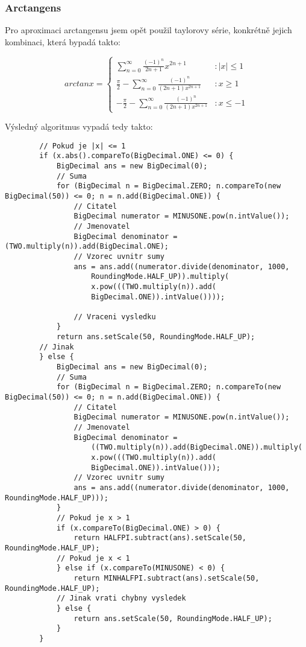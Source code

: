 \documentclass{article}
\begin{document}
    \subsubsection{Arctangens}
    Pro aproximaci arctangensu jsem opět použil taylorovy série, konkrétně jejich kombinaci, která bypadá takto:
    \begin{center}
        \begin{equation}            
            arctan x = \begin{cases}
                \displaystyle\sum_{n=0}^{\infty}\frac{(-1)^n}{2n+1}x^{2n+1} & \text{$: |x|\leq 1$}\\
                \frac{\pi}{2}-\displaystyle\sum_{n=0}^{\infty}\frac{(-1)^n}{(2n+1)x^{2n+1}} & \text{$: x \geq 1$}\\
                -\frac{\pi}{2}-\displaystyle\sum_{n=0}^{\infty}\frac{(-1)^n}{(2n+1)x^{2n+1}} & \text{$: x \leq -1$}
            \end{cases}
        \end{equation}
    \end{center}
    Výsledný algoritmus vypadá tedy takto:
    \sloppy
    \begin{lstlisting}
        // Pokud je |x| <= 1
        if (x.abs().compareTo(BigDecimal.ONE) <= 0) {
            BigDecimal ans = new BigDecimal(0);
            // Suma
            for (BigDecimal n = BigDecimal.ZERO; n.compareTo(new BigDecimal(50)) <= 0; n = n.add(BigDecimal.ONE)) {
                // Citatel
                BigDecimal numerator = MINUSONE.pow(n.intValue());
                // Jmenovatel
                BigDecimal denominator = (TWO.multiply(n)).add(BigDecimal.ONE);
                // Vzorec uvnitr sumy
                ans = ans.add((numerator.divide(denominator, 1000, 
                    RoundingMode.HALF_UP)).multiply(
                    x.pow(((TWO.multiply(n)).add(
                    BigDecimal.ONE)).intValue())));

                // Vraceni vysledku
            }
            return ans.setScale(50, RoundingMode.HALF_UP);
        // Jinak
        } else {
            BigDecimal ans = new BigDecimal(0);
            // Suma
            for (BigDecimal n = BigDecimal.ZERO; n.compareTo(new BigDecimal(50)) <= 0; n = n.add(BigDecimal.ONE)) {
                // Citatel
                BigDecimal numerator = MINUSONE.pow(n.intValue());
                // Jmenovatel
                BigDecimal denominator = 
                    ((TWO.multiply(n)).add(BigDecimal.ONE)).multiply(
                    x.pow(((TWO.multiply(n)).add(
                    BigDecimal.ONE)).intValue()));
                // Vzorec uvnitr sumy
                ans = ans.add((numerator.divide(denominator, 1000, RoundingMode.HALF_UP)));
            }
            // Pokud je x > 1
            if (x.compareTo(BigDecimal.ONE) > 0) {
                return HALFPI.subtract(ans).setScale(50, RoundingMode.HALF_UP);
            // Pokud je x < 1
            } else if (x.compareTo(MINUSONE) < 0) {
                return MINHALFPI.subtract(ans).setScale(50, RoundingMode.HALF_UP);
            // Jinak vrati chybny vysledek
            } else {
                return ans.setScale(50, RoundingMode.HALF_UP);
            }
        }
    \end{lstlisting}
\end{document}
